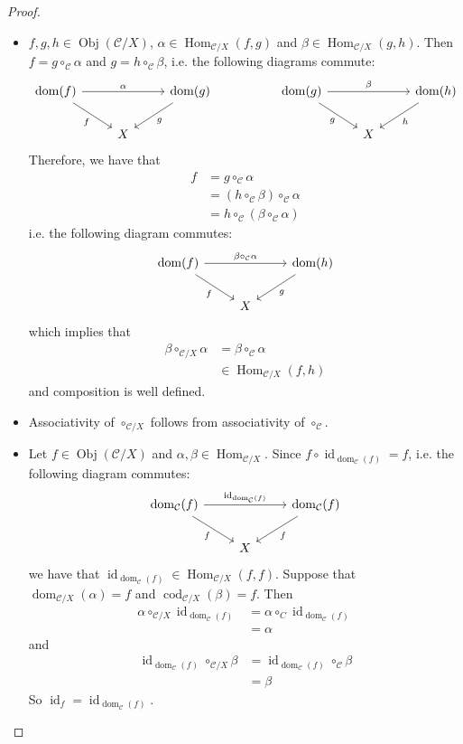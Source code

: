 \documentclass[12pt]{amsart}
\theoremstyle{definition}
\newcommand{\al}{\alpha}
\newcommand{\be}{\beta}
\newcommand{\MC}{\mathcal{C}}
\DeclareMathOperator{\id}{id}
\DeclareMathOperator{\dom}{dom}
\DeclareMathOperator{\cod}{cod}
\DeclareMathOperator{\Obj}{Obj}
\DeclareMathOperator{\Hom}{Hom}
\DeclareMathOperator*{\0}{\mbf{0}}
\DeclareMathOperator*{\1}{\mbf{1}}
\begin{document}
	\begin{proof}\
		\begin{itemize}
			\item $f,g, h \in \Obj(\MC / X)$, $\al \in \Hom_{\MC / X}(f, g)$ and $\be \in \Hom_{\MC / X}(g, h)$. Then $f = g \circ_{\MC} \al$ and $g = h \circ_{\MC} \be$, i.e. the following diagrams commute:
			\[ \begin{tikzcd}
				\dom(f) \arrow[rr, "\al"] \arrow[dr, "f"'] 	
				&& \dom(g)  \arrow[dl, "g"]  
				&& \dom(g) \arrow[rr, "\be"] \arrow[dr, "g"'] 	
				&& \dom(h)  \arrow[dl, "h"]\\
				& X 
				&& &&X
			\end{tikzcd}
			\]
			Therefore, we have that 
			\begin{align*}
				f 
				& = g \circ_{\MC} \al \\
				& = (h \circ_{\MC} \be) \circ_{\MC} \al \\
				&= h \circ_{\MC} (\be \circ_{\MC} \al) 
			\end{align*}
			i.e. the following diagram commutes:
			\[ 
			\begin{tikzcd}
				\dom(f) \arrow[rr, "\be \circ_{\MC} \al"] \arrow[dr, "f"'] 	
				& & \dom(h)  \arrow[dl, "g"] \\
				& X 
			\end{tikzcd}
			\]
			which implies that 
			\begin{align*}
				\be \circ_{\MC / X} \al 
				& = \be \circ_{\MC} \al \\
				& \in \Hom_{\MC / X}(f, h)
			\end{align*}
			and composition is well defined. 
			\item Associativity of $\circ_{\MC / X}$ follows from associativity of $\circ_\MC$.
			\item Let $f \in \Obj(\MC / X)$ and $\al, \be \in \Hom_{\MC / X}$. Since $f \circ \id_{\dom_{\MC}(f)} = f$, i.e. the following diagram commutes: 
			\[ \begin{tikzcd}
				\dom_{\MC}(f) \arrow[rr, "\id_{\dom_{\MC}(f)}"] \arrow[dr, "f"'] 	
				& & \dom_{\MC}(f)  \arrow[dl, "f"] \\
				& X 
			\end{tikzcd}
			\]
			we have that $\id_{\dom_{\MC}(f)} \in \Hom_{\MC / X}(f, f)$.
			Suppose that $\dom_{\MC / X}(\al) = f$ and $\cod_{\MC /X}(\be) = f$. Then 
			\begin{align*}
				\al \circ_{\MC /X} \id_{\dom_{\MC}(f)}
				&= \al \circ_{C} \id_{\dom_{\MC}(f)} \\
				&= \al
			\end{align*}
			and 
			\begin{align*}
				\id_{\dom_{\MC}(f)} \circ_{\MC /X} \be
				&= \id_{\dom_{\MC}(f)} \circ_{\MC} \be \\
				&= \be
			\end{align*}
			So $\id_f = \id_{\dom_{\MC}(f)}$.
		\end{itemize}
	\end{proof}
\end{document}
